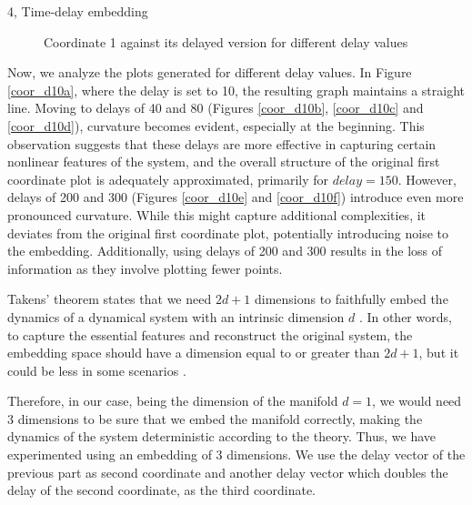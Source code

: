 \begin{task}{4, Time-delay embedding}
\begin{figure}[H]
\caption{Coordinate 1 against its delayed version for different delay values}
\label{coor_d10}
\end{figure}

Now, we analyze the plots generated for different delay values. In Figure \ref{coor_d10a}, where the delay is set to 10, the resulting graph maintains a straight line. Moving to delays of 40 and 80 (Figures \ref{coor_d10b}, \ref{coor_d10c} and \ref{coor_d10d}), curvature becomes evident, especially at the beginning. This observation suggests that these delays are more effective in capturing certain nonlinear features of the system, and the overall structure of the original first coordinate plot is adequately approximated, primarily for \(delay = 150\). However, delays of 200 and 300 (Figures \ref{coor_d10e} and \ref{coor_d10f}) introduce even more pronounced curvature. While this might capture additional complexities, it deviates from the original first coordinate plot, potentially introducing noise to the embedding. Additionally, using delays of 200 and 300 results in the loss of information as they involve plotting fewer points.

Takens' theorem states that we need \(2d + 1\) dimensions to faithfully embed the dynamics of a dynamical system with an intrinsic dimension \(d\) \cite{shalizi2006methods}. In other words, to capture the essential features and reconstruct the original system, the embedding space should have a dimension equal to or greater than \(2d + 1\), but it could be less in some scenarios \cite{baranski2020probabilistic}.

Therefore, in our case, being the dimension of the manifold \(d = 1\), we would need 3 dimensions to be sure that we embed the manifold correctly, making the dynamics of the system deterministic according to the theory. Thus, we have experimented using an embedding of 3 dimensions. We use the delay vector of the previous part as second coordinate and another delay vector which doubles the delay of the second coordinate, as the third coordinate.


\end{task}
